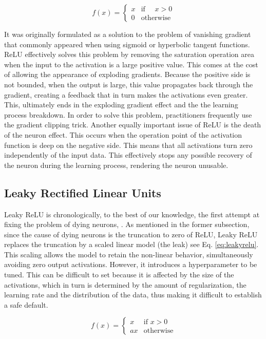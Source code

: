 \documentclass[10pt,twocolumn,letterpaper]{article}
\begin{document}
\begin{equation}
f(x)={\begin{cases}x&{\mbox{if }}\quad x>0\\0&{\mbox{otherwise}}\end{cases}}
\label{eq:relu}
\end{equation}

It was originally formulated as a solution to the problem of vanishing gradient that commonly appeared when using sigmoid or hyperbolic tangent functions. ReLU effectively solves this problem by removing the saturation operation area when the input to the activation is a large positive value. This comes at the cost of allowing the appearance of exploding gradients. Because the positive side is not bounded, when the output is large, this value propagates back through the gradient, creating a feedback that in turn makes the activations even greater. This, ultimately ends in the exploding gradient effect and the the learning process breakdown. In order to solve this problem, practitioners frequently use the gradient clipping trick. Another equally important issue of ReLU is the death of the neuron effect. This occurs when the operation point of the activation function is deep on the negative side. This means that all activations turn zero independently of the input data. This effectively stops any possible recovery of the neuron during the learning process, rendering the neuron unusable. 

\subsection{Leaky Rectified Linear Units}

Leaky ReLU is chronologically, to the best of our knowledge, the first attempt at fixing the problem of dying neurons, \cite{leakyrelu}. As mentioned in the former subsection, since the cause of dying neurons is the truncation to zero of ReLU, Leaky ReLU replaces the truncation by a scaled linear model (the leak) see Eq. \ref{eq:leakyrelu}. This scaling allows the model to retain the non-linear behavior, simultaneously avoiding zero output activations. However, it introduces a hyperparameter to be tuned. This can be difficult to set because it is affected by the size of the activations, which in turn is determined by the amount of regularization, the learning rate and the distribution of the data, thus making it difficult to establish a safe default.

\begin{equation}
f(x)={\begin{cases}x&{\mbox{if }}x>0\\ax&{\mbox{otherwise}}\end{cases}}
\label{eq:leakyrelu}
\end{equation}
\end{document}
